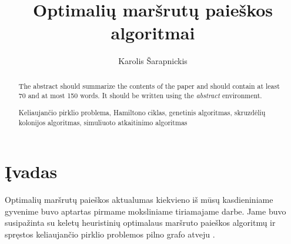 \documentclass[runningheads,a4paper]{llncs}
\newcommand{\keywords}[1]{\par\addvspace\baselineskip
\noindent\keywordname\enspace\ignorespaces#1}
\begin{document}
\mainmatter  %

\title{Optimalių maršrutų paieškos algoritmai}


%
%
\author{Karolis Šarapnickis}
%


%
%

\maketitle


\begin{abstract}
The abstract should summarize the contents of the paper and should
contain at least 70 and at most 150 words. It should be written using the
\emph{abstract} environment.
\keywords{Keliaujančio pirklio problema, Hamiltono ciklas, genetinis algoritmas, skruzdėlių kolonijos algoritmas, simuliuoto atkaitinimo algoritmas}
\end{abstract}


\section{Įvadas}

Optimalių maršrutų paieškos aktualumas kiekvieno iš mūsų kasdieniniame gyvenime buvo aptartas pirmame moksliniame tiriamajame darbe. Jame buvo susipažinta su keletų heuristinių optimalaus maršruto paieškos algoritmų ir spręstos keliaujančio pirklio problemos pilno grafo atveju \cite{mtd1}.
\end{document}
